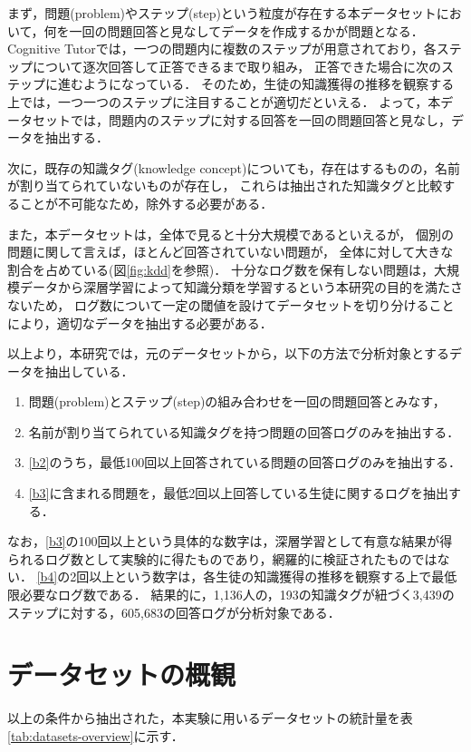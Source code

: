 まず，問題(problem)やステップ(step)という粒度が存在する本データセットにおいて，何を一回の問題回答と見なしてデータを作成するかが問題となる．
Cognitive Tutorでは，一つの問題内に複数のステップが用意されており，各ステップについて逐次回答して正答できるまで取り組み，
正答できた場合に次のステップに進むようになっている．
そのため，生徒の知識獲得の推移を観察する上では，一つ一つのステップに注目することが適切だといえる．
よって，本データセットでは，問題内のステップに対する回答を一回の問題回答と見なし，データを抽出する．

次に，既存の知識タグ(knowledge concept)についても，存在はするものの，名前が割り当てられていないものが存在し，
これらは抽出された知識タグと比較することが不可能なため，除外する必要がある．
 
また，本データセットは，全体で見ると十分大規模であるといえるが，
個別の問題に関して言えば，ほとんど回答されていない問題が，
全体に対して大きな割合を占めている(図\ref{fig:kdd}を参照)．
十分なログ数を保有しない問題は，大規模データから深層学習によって知識分類を学習するという本研究の目的を満たさないため，
ログ数について一定の閾値を設けてデータセットを切り分けることにより，適切なデータを抽出する必要がある．


以上より，本研究では，元のデータセットから，以下の方法で分析対象とするデータを抽出している．
\begin{enumerate}
	\item 問題(problem)とステップ(step)の組み合わせを一回の問題回答とみなす，\label{b1}
	\item 名前が割り当てられている知識タグを持つ問題の回答ログのみを抽出する．\label{b2}
	\item \ref{b2}のうち，最低100回以上回答されている問題の回答ログのみを抽出する．\label{b3}
	\item \ref{b3}に含まれる問題を，最低2回以上回答している生徒に関するログを抽出する．\label{b4}
\end{enumerate}

なお，\ref{b3}の100回以上という具体的な数字は，深層学習として有意な結果が得られるログ数として実験的に得たものであり，網羅的に検証されたものではない．
\ref{b4}の2回以上という数字は，各生徒の知識獲得の推移を観察する上で最低限必要なログ数である．
結果的に，1,136人の，193の知識タグが紐づく3,439のステップに対する，605,683の回答ログが分析対象である．


\section{データセットの概観}
以上の条件から抽出された，本実験に用いるデータセットの統計量を表\ref{tab:datasets-overview}に示す．

